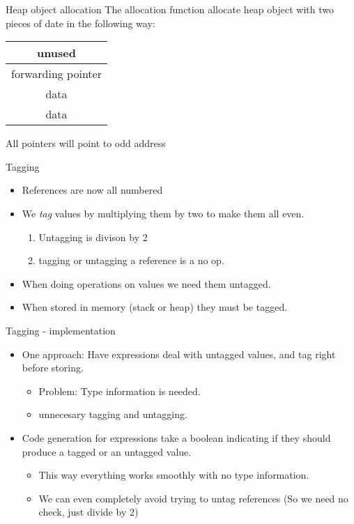 \documentclass{beamer}
\begin{document}
\begin{frame}{Heap object allocation}
The allocation function allocate heap object with two pieces of
date in the following way:
\begin{table}
\centering
\begin{tabular}{| c |}
\hline
unused \\
\hline
forwarding pointer \\
\hline
data \\
\hline
data \\
\hline
\end{tabular}
\end{table}
All pointers will point to odd address
\end{frame}
\begin{frame}{Tagging}
\begin{itemize}
\item References are now all numbered
\item We \emph{tag} values by multiplying them by two to make them all
even.
\begin{enumerate}
\item Untagging is divison by 2
\item tagging or untagging a reference is a no op.
\end{enumerate}
\item When doing operations on values we need them untagged.
\item When stored in memory (stack or heap) they must be tagged.
\end{itemize}
\end{frame}

\begin{frame}{Tagging - implementation}
\begin{itemize}
\item One approach: Have expressions deal with untagged values, and
tag right before storing.
\begin{itemize}
\item Problem: Type information is needed.
\item unnecesary tagging and untagging.
\end{itemize}
\item Code generation for expressions take a boolean indicating if 
they should produce a tagged or an untagged value.
\begin{itemize}
\item This way everything works smoothly with no type information.
\item We can even completely avoid trying to untag references (So
 we need no check, just divide by 2)
\end{itemize}
\end{itemize}
\end{frame}
\end{document}
